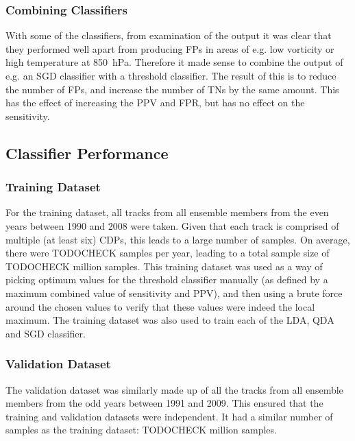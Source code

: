 \documentclass[pdftex,12pt,a4paper]{report}
\begin{document}
\subsubsection{Combining Classifiers}
With some of the classifiers, from examination of the output it was clear that they performed well
apart from producing FPs in areas of e.g. low vorticity or high temperature at \SI{850}{hPa}.
Therefore it made sense to combine the output of e.g. an SGD classifier with a threshold classifier.
The result of this is to reduce the number of FPs, and increase the number of TNs by the same
amount. This has the effect of increasing the PPV and FPR, but has no effect on the sensitivity.

\subsection{Classifier Performance}



\subsubsection{Training Dataset}
For the training dataset, all tracks from all ensemble members from the even years between 1990 and
2008 were taken. Given that each track is comprised of multiple (at least six) CDPs, this leads to a
large number of samples. On average, there were TODOCHECK samples per year, leading to a total
sample size of TODOCHECK million samples. This training dataset was used as a way of picking optimum
values for the threshold classifier manually (as defined by a maximum combined value of sensitivity
and PPV), and then using a brute force around the chosen values to verify that these values were
indeed the local maximum. The training dataset was also used to train each of the LDA, QDA and SGD
classifier.

\subsubsection{Validation Dataset} The validation dataset was similarly made up of all the tracks
from all ensemble members from the odd years between 1991 and 2009. This ensured that the training
and validation datasets were independent. It had a similar number of samples as the training
dataset: TODOCHECK million samples.
\end{document}
